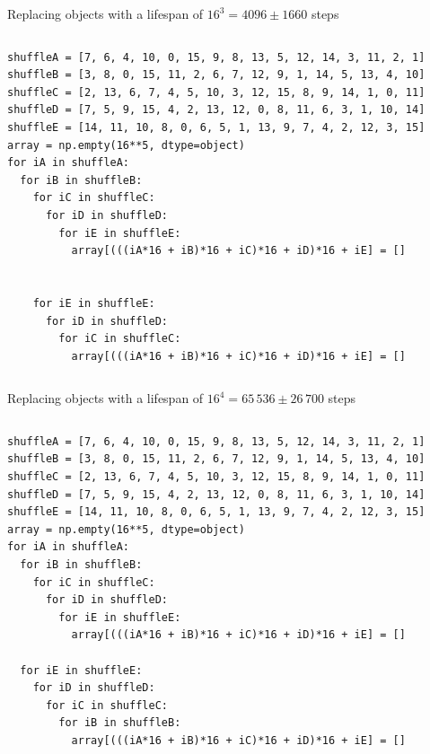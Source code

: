\documentclass[aspectratio=169]{beamer}
\begin{document}
\begin{frame}[fragile]{Replacing objects with a lifespan of $16^3 = 4096 \pm 1660$ steps}
\small
\begin{columns}
\begin{verbatim}
shuffleA = [7, 6, 4, 10, 0, 15, 9, 8, 13, 5, 12, 14, 3, 11, 2, 1]
shuffleB = [3, 8, 0, 15, 11, 2, 6, 7, 12, 9, 1, 14, 5, 13, 4, 10]
shuffleC = [2, 13, 6, 7, 4, 5, 10, 3, 12, 15, 8, 9, 14, 1, 0, 11]
shuffleD = [7, 5, 9, 15, 4, 2, 13, 12, 0, 8, 11, 6, 3, 1, 10, 14]
shuffleE = [14, 11, 10, 8, 0, 6, 5, 1, 13, 9, 7, 4, 2, 12, 3, 15]
array = np.empty(16**5, dtype=object)
for iA in shuffleA:
  for iB in shuffleB:
    for iC in shuffleC:
      for iD in shuffleD:
        for iE in shuffleE:
          array[(((iA*16 + iB)*16 + iC)*16 + iD)*16 + iE] = []


    for iE in shuffleE:
      for iD in shuffleD:
        for iC in shuffleC:
          array[(((iA*16 + iB)*16 + iC)*16 + iD)*16 + iE] = []
\end{verbatim}
\end{columns}
\end{frame}

\begin{frame}[fragile]{Replacing objects with a lifespan of $16^4 = 65\,536 \pm 26\,700$ steps}
\small
\begin{columns}
\begin{verbatim}
shuffleA = [7, 6, 4, 10, 0, 15, 9, 8, 13, 5, 12, 14, 3, 11, 2, 1]
shuffleB = [3, 8, 0, 15, 11, 2, 6, 7, 12, 9, 1, 14, 5, 13, 4, 10]
shuffleC = [2, 13, 6, 7, 4, 5, 10, 3, 12, 15, 8, 9, 14, 1, 0, 11]
shuffleD = [7, 5, 9, 15, 4, 2, 13, 12, 0, 8, 11, 6, 3, 1, 10, 14]
shuffleE = [14, 11, 10, 8, 0, 6, 5, 1, 13, 9, 7, 4, 2, 12, 3, 15]
array = np.empty(16**5, dtype=object)
for iA in shuffleA:
  for iB in shuffleB:
    for iC in shuffleC:
      for iD in shuffleD:
        for iE in shuffleE:
          array[(((iA*16 + iB)*16 + iC)*16 + iD)*16 + iE] = []

  for iE in shuffleE:
    for iD in shuffleD:
      for iC in shuffleC:
        for iB in shuffleB:
          array[(((iA*16 + iB)*16 + iC)*16 + iD)*16 + iE] = []
\end{verbatim}
\end{columns}
\end{frame}
\end{document}
